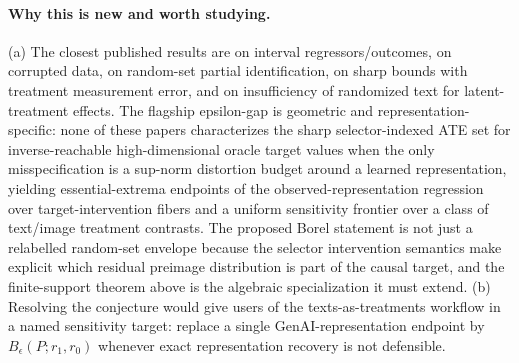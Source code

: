 \documentclass[11pt]{article}
\theoremstyle{definition}
\theoremstyle{plain}
\theoremstyle{remark}
\begin{document}
\paragraph{Why this is new and worth studying.}
(a) The closest published results are \citet{ManskiTamer2002} on interval regressors/outcomes, \citet{HorowitzManski1995} on corrupted data, \citet{BeresteanuMolchanovMolinari2012} on random-set partial identification, \citet{Ura2018} on sharp bounds with treatment measurement error, and \citet{FongGrimmer2023} on insufficiency of randomized text for latent-treatment effects.  The flagship epsilon-gap is geometric and representation-specific: none of these papers characterizes the sharp selector-indexed ATE set for inverse-reachable high-dimensional oracle target values when the only misspecification is a sup-norm distortion budget around a learned representation, yielding essential-extrema endpoints of the observed-representation regression over target-intervention fibers and a uniform sensitivity frontier over a class of text/image treatment contrasts.  The proposed Borel statement is not just a relabelled random-set envelope because the selector intervention semantics make explicit which residual preimage distribution is part of the causal target, and the finite-support theorem above is the algebraic specialization it must extend.  (b) Resolving the conjecture would give users of the texts-as-treatments workflow in \citet{ImaiNakamura2024TextTreatments} a named sensitivity target: replace a single GenAI-representation endpoint by \(B_\epsilon(P;r_1,r_0)\) whenever exact representation recovery is not defensible.
\end{document}
